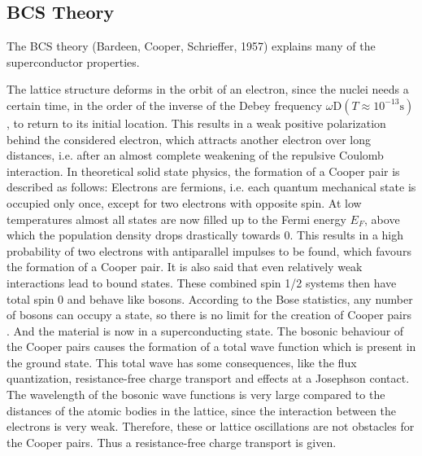 \subsection{BCS Theory}
The BCS theory (Bardeen, Cooper, Schrieffer, 1957) explains many of the superconductor properties. 

The lattice structure deforms in the orbit of an electron, since the nuclei needs a certain time, in the order of the inverse of the Debey frequency $\omega\text{D} (T \approx 10^{-13}\text{s})$, to return to its initial location. This results in a weak positive polarization behind the considered electron, which attracts another electron over long distances, i.e. after an almost complete weakening of the repulsive Coulomb interaction.
In theoretical solid state physics, the formation of a Cooper pair is described as follows: Electrons are fermions, i.e. each quantum mechanical state is occupied only once, except for two electrons with opposite spin. At low temperatures almost all states are now filled up to the Fermi energy $E_F$, above which the population density drops drastically towards 0. This results in a high probability of two electrons with antiparallel impulses to be found, which favours the formation of a Cooper pair. It is also said that even relatively weak interactions lead to bound states. These combined spin 1/2 systems then have total spin 0 and behave like bosons. According to the Bose statistics, any number of bosons can occupy a state, so there is no limit for the creation of Cooper pairs . And the material is now in a superconducting state. The bosonic behaviour of the Cooper pairs causes the formation of a total wave function which is present in the ground state. This total wave has some consequences, like the flux quantization, resistance-free charge transport and effects at a Josephson contact. The wavelength of the bosonic wave functions is very large compared to the distances of the atomic bodies in the lattice, since the interaction between the electrons is very weak. Therefore, these or lattice oscillations are not obstacles for the Cooper pairs. Thus a resistance-free charge transport is given.

